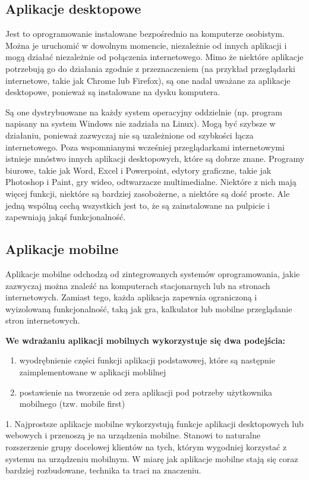 \subsection{Aplikacje desktopowe}

Jest to oprogramowanie instalowane bezpośrednio na komputerze osobistym. Można je uruchomić w dowolnym momencie, niezależnie od innych aplikacji i mogą działać niezależnie od połączenia internetowego. Mimo że niektóre aplikacje potrzebują go do działania zgodnie z przeznaczeniem (na przykład przeglądarki internetowe, takie jak Chrome lub Firefox), są one nadal uważane za aplikacje desktopowe, ponieważ są instalowane na dysku komputera.

Są one dystrybuowane na każdy system operacyjny oddzielnie (np. program napisany na system Windows nie zadziała na Linux). Mogą być szybsze w działaniu, ponieważ zazwyczaj nie są uzależnione od szybkości łącza internetowego. Poza wspomnianymi wcześniej przeglądarkami internetowymi istnieje mnóstwo innych aplikacji desktopowych, które są dobrze znane. Programy biurowe, takie jak Word, Excel i Powerpoint, edytory graficzne, takie jak Photoshop i Paint, gry wideo, odtwarzacze multimedialne. Niektóre z nich mają więcej funkcji, niektóre są bardziej zasobożerne, a niektóre są dość proste. Ale jedną wspólną cechą wszystkich jest to, że są zainstalowane na pulpicie i zapewniają jakąś funkcjonalność.

\subsection{Aplikacje mobilne}
Aplikacje mobilne odchodzą od zintegrowanych systemów oprogramowania, jakie zazwyczaj można znaleźć na komputerach stacjonarnych lub na stronach internetowych. Zamiast tego, każda aplikacja zapewnia ograniczoną i wyizolowaną funkcjonalność, taką jak gra, kalkulator lub mobilne przeglądanie stron internetowych.

\textbf{We wdrażaniu aplikacji mobilnych wykorzystuje się dwa podejścia:}

\begin{enumerate}
    \item wyodrębnienie części funkcji aplikacji podstawowej, które są następnie zaimplementowane w aplikacji moblilnej
    \item postawienie na tworzenie od zera aplikacji pod potrzeby użytkownika mobilnego (tzw. mobile first) 
\end{enumerate}

1. Najprostsze aplikacje mobilne wykorzystują funkcje aplikacji desktopowych lub webowych i przenoszą je na urządzenia mobilne. Stanowi to naturalne rozszerzenie grupy docelowej klientów na tych, którym wygodniej korzystać z systemu na urządzeniu mobilnym. W miarę jak aplikacje mobilne stają się coraz bardziej rozbudowane, technika ta traci na znaczeniu. 

